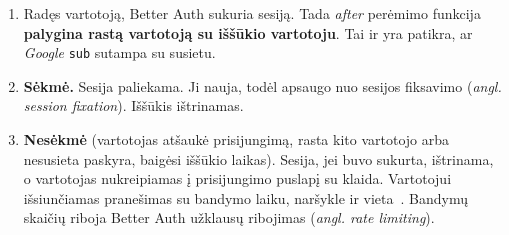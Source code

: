 \begin{enumerate}
    \item Radęs vartotoją, Better Auth sukuria sesiją. Tada \textit{after} perėmimo funkcija \textbf{palygina rastą vartotoją su iššūkio vartotoju}. Tai ir yra patikra, ar \textit{Google} \texttt{sub} sutampa su susietu.
    \item \textbf{Sėkmė.} Sesija paliekama. Ji nauja, todėl apsaugo nuo sesijos fiksavimo (\textit{angl. session fixation}). Iššūkis ištrinamas.
    \item \textbf{Nesėkmė} (vartotojas atšaukė prisijungimą, rasta kito vartotojo arba nesusieta paskyra, baigėsi iššūkio laikas). Sesija, jei buvo sukurta, ištrinama, o vartotojas nukreipiamas į prisijungimo puslapį su klaida. Vartotojui išsiunčiamas pranešimas su bandymo laiku, naršykle ir vieta~\cite{VMA}. Bandymų skaičių riboja Better Auth užklausų ribojimas (\textit{angl. rate limiting}).
\end{enumerate}
